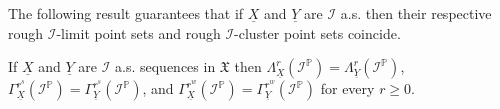 \documentclass[reqno]{amsart}
\begin{document}
The following result guarantees that if $\underline{X}$ and $\underline{Y}$ are $\mathcal{I}$ a.s. then their respective rough $\mathcal{I}$-limit point sets and rough $\mathcal{I}$-cluster point sets coincide.
\begin{proposition}
	If $\underline{X}$ and $\underline{Y}$ are $\mathcal{I}$ a.s. sequences in $\mathfrak{X}$ then $\Lambda^{r}_{\underline{X}}(\mathcal{I}^{\mathbb{P}})=\Lambda^{r}_{\underline{Y}}(\mathcal{I}^{\mathbb{P}})$,  $\Gamma^{r^s}_{\underline{X}}(\mathcal{I}^{\mathbb{P}})=\Gamma^{r^s}_{\underline{Y}}(\mathcal{I}^{\mathbb{P}})$,  and $\Gamma^{r^w}_{\underline{X}}(\mathcal{I}^{\mathbb{P}})=\Gamma^{r^w}_{\underline{Y}}(\mathcal{I}^{\mathbb{P}})$ for every $r\geq 0$.
\end{proposition}
\end{document}
